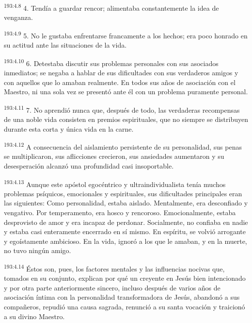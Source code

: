 \par
\textsuperscript{193:4.8} 4. Tendía a guardar rencor; alimentaba constantemente la idea de venganza.

\par
\textsuperscript{193:4.9} 5. No le gustaba enfrentarse francamente a los hechos; era poco honrado en su actitud ante las situaciones de la vida.

\par
\textsuperscript{193:4.10} 6. Detestaba discutir sus problemas personales con sus asociados inmediatos; se negaba a hablar de sus dificultades con sus verdaderos amigos y con aquellos que lo amaban realmente. En todos sus años de asociación con el Maestro, ni una sola vez se presentó ante él con un problema puramente personal.

\par
\textsuperscript{193:4.11} 7. No aprendió nunca que, después de todo, las verdaderas recompensas de una noble vida consisten en premios espirituales, que no siempre se distribuyen durante esta corta y única vida en la carne.

\par
\textsuperscript{193:4.12} A consecuencia del aislamiento persistente de su personalidad, sus penas se multiplicaron, sus aflicciones crecieron, sus ansiedades aumentaron y su desesperación alcanzó una profundidad casi insoportable.

\par
\textsuperscript{193:4.13} Aunque este apóstol egocéntrico y ultraindividualista tenía muchos problemas psíquicos, emocionales y espirituales, sus dificultades principales eran las siguientes: Como personalidad, estaba aislado. Mentalmente, era desconfiado y vengativo. Por temperamento, era hosco y rencoroso. Emocionalmente, estaba desprovisto de amor y era incapaz de perdonar. Socialmente, no confiaba en nadie y estaba casi enteramente encerrado en sí mismo. En espíritu, se volvió arrogante y egoístamente ambicioso. En la vida, ignoró a los que le amaban, y en la muerte, no tuvo ningún amigo.

\par
\textsuperscript{193:4.14} Éstos son, pues, los factores mentales y las influencias nocivas que, tomados en su conjunto, explican por qué un creyente en Jesús bien intencionado y por otra parte anteriormente sincero, incluso después de varios años de asociación íntima con la personalidad transformadora de Jesús, abandonó a sus compañeros, repudió una causa sagrada, renunció a su santa vocación y traicionó a su divino Maestro.

